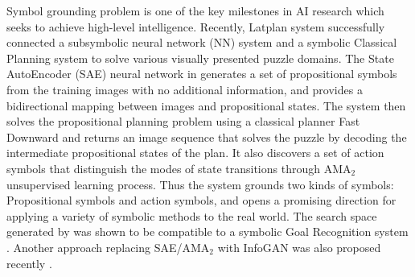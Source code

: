 Symbol grounding problem \cite{harnad1990symbol,Steels2008} is one of the key milestones in AI research
which seeks to achieve high-level intelligence.
% 
% 
Recently, Latplan system \cite[]{Asai2018} successfully
connected a subsymbolic neural network (NN) system and a symbolic Classical Planning system
to solve various visually presented puzzle domains.
The State AutoEncoder (SAE) neural network in \latentplanner
generates a set of propositional symbols from the training images with no additional information,
and provides a bidirectional mapping between images and propositional states.
% 
The system then solves the propositional planning problem using a classical planner Fast Downward \cite{Helmert04}
and returns an image sequence that solves the puzzle
by decoding the intermediate propositional states of the plan.
It also discovers a set of action symbols that distinguish the modes of
state transitions through AMA$_2$ unsupervised learning process.
Thus the system grounds two kinds of symbols:
Propositional symbols and action symbols,
% 
and opens a promising direction for applying a variety of symbolic methods to the real world.
The search space generated by \latentplanner was shown to be compatible
to a symbolic Goal Recognition system \cite{amado2018goal}.
Another approach replacing SAE/AMA$_2$ with InfoGAN was also proposed recently \cite{kurutach2018learning}.

